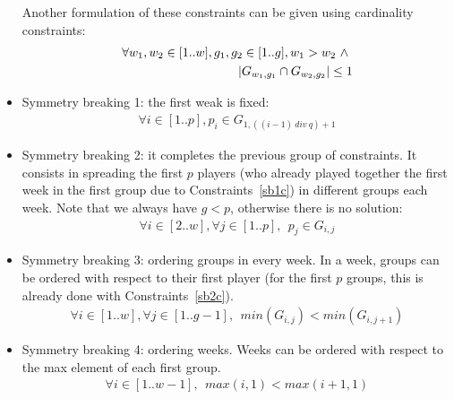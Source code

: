 \documentclass[3p,authoryear,times]{elsarticle}
\begin{document}
\begin{itemize}
Another formulation of these constraints can be given using cardinality constraints:
\begin{eqnarray}
\forall w_1, w_2 \in [1..w], 
g_1, g_2 \in [1..g], 
w_1 > w_2 ~\wedge~    \label{s5}\\ 
|G_{w_1,g_1} \cap G_{w_2,g_2}| \leq 1 \notag 
\end{eqnarray}

\item Symmetry breaking 1: the first weak is fixed:
\begin{eqnarray}
\forall i \in [1..p], p_i \in G_{1,( (i-1) ~div~ q )+1}  \label{sb1c}
\end{eqnarray}

\item Symmetry breaking 2: it  completes the previous group of constraints. It consists in spreading the first $p$ players (who already played together the first week in the first group due to Constraints~\ref{sb1c}) in different groups each week. Note that we always have $g < p$, otherwise there is no solution: 
\begin{eqnarray}
\forall i \in [2..w], \forall j \in [1..p], ~~p_j \in G_{i,j}\label{sb2c}
\end{eqnarray}

\item Symmetry breaking 3: ordering groups in every week. In a week, groups can be ordered with respect to their first player (for the first $p$ groups, this is already done with Constraints~\ref{sb2c}). 
\begin{eqnarray}
\forall i \in [1..w], 
\forall j \in  [1..g-1],~~ %
min(G_{i,j}) < min(G_{i,j+1}) \label{sbg2}
\end{eqnarray}

\item Symmetry breaking 4: ordering weeks. Weeks can be ordered with respect to the max element of each first group.
\begin{eqnarray}
\forall i \in [1..w-1], ~~
max(i,1) < max(i+1,1) \label{sbw7}
\end{eqnarray}





\end{itemize}
\end{document}
